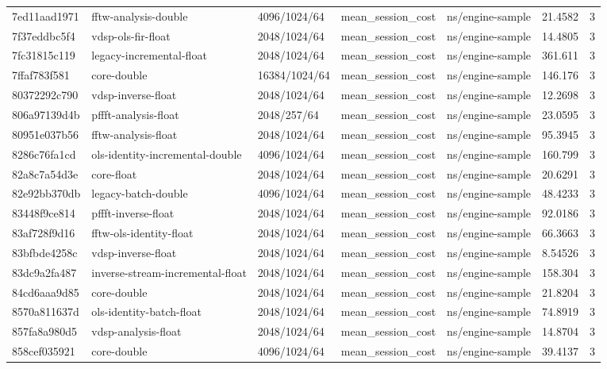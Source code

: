 \begin{longtable}{lllllrr}
7ed11aad1971 & fftw-analysis-double & 4096/1024/64 & mean\_session\_cost & ns/engine-sample & 21.4582 & 3 \\
7f37eddbc5f4 & vdsp-ols-fir-float & 2048/1024/64 & mean\_session\_cost & ns/engine-sample & 14.4805 & 3 \\
7fc31815c119 & legacy-incremental-float & 2048/1024/64 & mean\_session\_cost & ns/engine-sample & 361.611 & 3 \\
7ffaf783f581 & core-double & 16384/1024/64 & mean\_session\_cost & ns/engine-sample & 146.176 & 3 \\
80372292c790 & vdsp-inverse-float & 2048/1024/64 & mean\_session\_cost & ns/engine-sample & 12.2698 & 3 \\
806a97139d4b & pffft-analysis-float & 2048/257/64 & mean\_session\_cost & ns/engine-sample & 23.0595 & 3 \\
80951e037b56 & fftw-analysis-float & 2048/1024/64 & mean\_session\_cost & ns/engine-sample & 95.3945 & 3 \\
8286c76fa1cd & ols-identity-incremental-double & 4096/1024/64 & mean\_session\_cost & ns/engine-sample & 160.799 & 3 \\
82a8c7a54d3e & core-float & 2048/1024/64 & mean\_session\_cost & ns/engine-sample & 20.6291 & 3 \\
82e92bb370db & legacy-batch-double & 4096/1024/64 & mean\_session\_cost & ns/engine-sample & 48.4233 & 3 \\
83448f9ce814 & pffft-inverse-float & 2048/1024/64 & mean\_session\_cost & ns/engine-sample & 92.0186 & 3 \\
83af728f9d16 & fftw-ols-identity-float & 2048/1024/64 & mean\_session\_cost & ns/engine-sample & 66.3663 & 3 \\
83bfbde4258c & vdsp-inverse-float & 2048/1024/64 & mean\_session\_cost & ns/engine-sample & 8.54526 & 3 \\
83dc9a2fa487 & inverse-stream-incremental-float & 2048/1024/64 & mean\_session\_cost & ns/engine-sample & 158.304 & 3 \\
84cd6aaa9d85 & core-double & 2048/1024/64 & mean\_session\_cost & ns/engine-sample & 21.8204 & 3 \\
8570a811637d & ols-identity-batch-float & 2048/1024/64 & mean\_session\_cost & ns/engine-sample & 74.8919 & 3 \\
857fa8a980d5 & vdsp-analysis-float & 2048/1024/64 & mean\_session\_cost & ns/engine-sample & 14.8704 & 3 \\
858cef035921 & core-double & 4096/1024/64 & mean\_session\_cost & ns/engine-sample & 39.4137 & 3 \\

\end{longtable}
